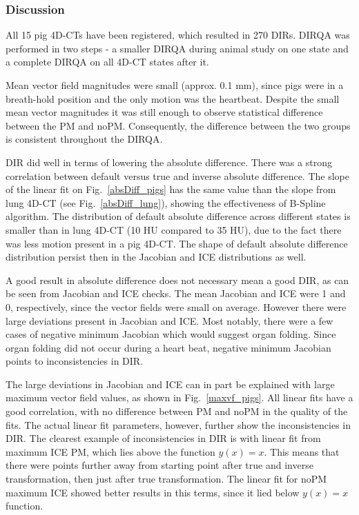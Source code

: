 \documentclass[type=dr, dr=rernat, accentcolor=tud7b,colorbacktitle, bigchapter, openright, twoside, 12pt ]{tudthesis}
\begin{document}
\subsubsection{Discussion}

All 15 pig 4D-CTs have been registered, which resulted in 270 DIRs. DIRQA was performed in two steps - a smaller DIRQA during animal study on one state and a complete DIRQA on all 4D-CT states after it.

Mean vector field magnitudes were small (approx. 0.1 mm), since pigs were in a breath-hold position and the only motion was the heartbeat. 
Despite the small mean vector magnitudes it was still enough to observe statistical difference between the PM and noPM.
Consequently, the difference between the two groups is consistent throughout the DIRQA.

DIR did well in terms of lowering the absolute difference. There was a strong correlation between default versus true and inverse absolute difference. 
The slope of the linear fit on Fig.~\ref{absDiff_pigs} has the same value than the slope from lung 4D-CT (see Fig.~\ref{absDiff_lung}), showing
the effectiveness of B-Spline algorithm. The distribution of default absolute difference across different states is smaller than in lung 4D-CT (10 HU compared to 35 HU), due to the fact
there was less motion present in a pig 4D-CT. The shape of default absolute difference
distribution persist then in the Jacobian and ICE distributions as well. 

A good result in absolute difference does not necessary mean a good DIR, as can be seen from Jacobian and ICE checks. The mean Jacobian and ICE were 1 and 0, respectively, since the
vector fields were small on average. However there were large deviations present in Jacobian and ICE. Most notably, there were a few cases of negative minimum Jacobian which would suggest 
organ folding. Since organ folding did not occur during a heart beat, negative minimum Jacobian points to inconsistencies in DIR. 

The large deviations in Jacobian and ICE can in part be explained with large maximum vector field values, as shown in Fig.~\ref{maxvf_pigs}. All linear fits have a good correlation, with no
difference between PM and noPM in the quality of the fits. The actual linear fit parameters, however, further show the inconsistencies in DIR. The clearest example of inconsistencies in
DIR is with linear fit from maximum ICE PM, which lies above the function $y(x)=x$. This means that there were points further away from starting point after true and inverse transformation, 
then just after true transformation. The linear fit for noPM maximum ICE showed better results in this terms, since it lied below $y(x)=x$ function.
\end{document}
